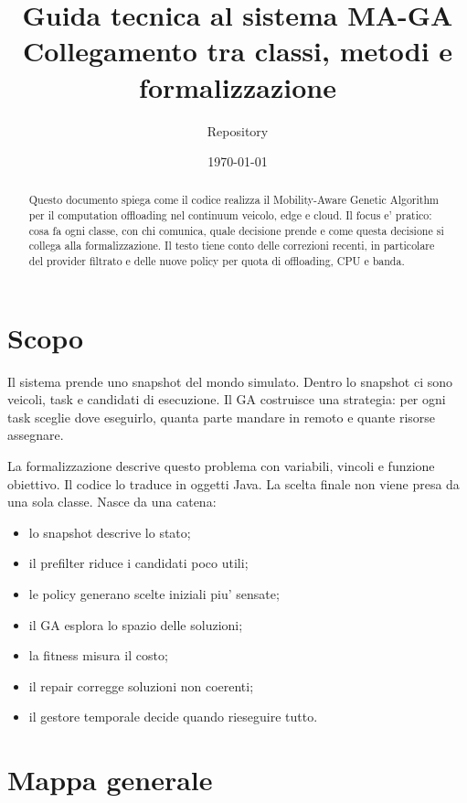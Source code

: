 \documentclass[11pt,a4paper]{article}
\title{\textbf{Guida tecnica al sistema MA-GA}\\
\large Collegamento tra classi, metodi e formalizzazione}
\author{Repository \code{maga-core}}
\date{\today}
\begin{document}
\maketitle

\begin{abstract}
Questo documento spiega come il codice realizza il Mobility-Aware Genetic
Algorithm per il computation offloading nel continuum veicolo, edge e cloud.
Il focus e' pratico: cosa fa ogni classe, con chi comunica, quale decisione
prende e come questa decisione si collega alla formalizzazione. Il testo tiene
conto delle correzioni recenti, in particolare del provider filtrato e delle
nuove policy per quota di offloading, CPU e banda.
\end{abstract}

\tableofcontents
\newpage

\section{Scopo}

Il sistema prende uno snapshot del mondo simulato. Dentro lo snapshot ci sono
veicoli, task e candidati di esecuzione. Il GA costruisce una strategia:
per ogni task sceglie dove eseguirlo, quanta parte mandare in remoto e quante
risorse assegnare.

La formalizzazione descrive questo problema con variabili, vincoli e funzione
obiettivo. Il codice lo traduce in oggetti Java. La scelta finale non viene
presa da una sola classe. Nasce da una catena:

\begin{itemize}[leftmargin=*,nosep]
    \item lo snapshot descrive lo stato;
    \item il prefilter riduce i candidati poco utili;
    \item le policy generano scelte iniziali piu' sensate;
    \item il GA esplora lo spazio delle soluzioni;
    \item la fitness misura il costo;
    \item il repair corregge soluzioni non coerenti;
    \item il gestore temporale decide quando rieseguire tutto.
\end{itemize}

\section{Mappa generale}
\end{document}
